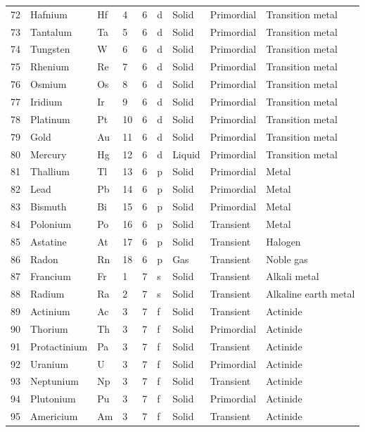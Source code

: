 \documentclass{article}
\begin{document}
\begin{tabular}{lllllllll}
72 & Hafnium & Hf & 4 & 6 & d & Solid & Primordial & Transition metal \\
73 & Tantalum & Ta & 5 & 6 & d & Solid & Primordial & Transition metal \\
74 & Tungsten & W & 6 & 6 & d & Solid & Primordial & Transition metal \\
75 & Rhenium & Re & 7 & 6 & d & Solid & Primordial & Transition metal \\
76 & Osmium & Os & 8 & 6 & d & Solid & Primordial & Transition metal \\
77 & Iridium & Ir & 9 & 6 & d & Solid & Primordial & Transition metal \\
78 & Platinum & Pt & 10 & 6 & d & Solid & Primordial & Transition metal \\
79 & Gold & Au & 11 & 6 & d & Solid & Primordial & Transition metal \\
80 & Mercury & Hg & 12 & 6 & d & Liquid & Primordial & Transition metal \\
81 & Thallium & Tl & 13 & 6 & p & Solid & Primordial & Metal \\
82 & Lead & Pb & 14 & 6 & p & Solid & Primordial & Metal \\
83 & Bismuth & Bi & 15 & 6 & p & Solid & Primordial & Metal \\
84 & Polonium & Po & 16 & 6 & p & Solid & Transient & Metal \\
85 & Astatine & At & 17 & 6 & p & Solid & Transient & Halogen \\
86 & Radon & Rn & 18 & 6 & p & Gas & Transient & Noble gas \\
87 & Francium & Fr & 1 & 7 & s & Solid & Transient & Alkali metal \\
88 & Radium & Ra & 2 & 7 & s & Solid & Transient & Alkaline earth metal \\
89 & Actinium & Ac & 3 & 7 & f & Solid & Transient & Actinide \\
90 & Thorium & Th & 3 & 7 & f & Solid & Primordial & Actinide \\
91 & Protactinium & Pa & 3 & 7 & f & Solid & Transient & Actinide \\
92 & Uranium & U & 3 & 7 & f & Solid & Primordial & Actinide \\
93 & Neptunium & Np & 3 & 7 & f & Solid & Transient & Actinide \\
94 & Plutonium & Pu & 3 & 7 & f & Solid & Primordial & Actinide \\
95 & Americium & Am & 3 & 7 & f & Solid & Transient & Actinide \\

\end{tabular}
\end{document}
